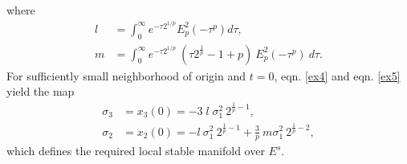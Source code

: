 \begin{exmp}
\begin{align}
\begin{split}
 	\end{split}
 \end{align}
 where \begin{align*}
 	l &= \int_{0}^{\infty} e^{-\tau 2^{1/p}} E_p ^2(-\tau^p) d\tau,\\
 	m &= \int_{0}^{\infty}  e^{-\tau 2^{1/p}}~(\tau 2^{\frac{1}{p}} -1 + p)~ E_p^2(-\tau^p)~d\tau. 
 \end{align*} 
 For sufficiently small neighborhood of origin and $t=0$, eqn. \eqref{ex4} and eqn. \eqref{ex5} yield the map
 \begin{align}
 	\sigma_3 &= x_3(0) = -3 \;l\;\sigma_1^2~2^{\frac{1}{p}-1},\\
 	\sigma_2 &=x_2(0) = -l~ \sigma_1^2~2^{\frac{1}{p}-1} + \frac{3}{p}~m \sigma_1^2~ 2^{\frac{1}{p}-2},
 \end{align}
which defines the required local stable manifold over $E^s$.   
\end{exmp}

